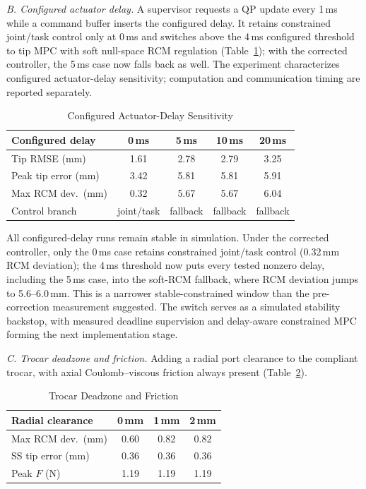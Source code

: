 \emph{B. Configured actuator delay.} A supervisor requests a QP update every 1\,ms while a command buffer inserts the configured delay. It retains constrained joint/task control only at 0\,ms and switches above the 4\,ms configured threshold to tip MPC with soft null-space RCM regulation (Table~\ref{tab:latency}); with the corrected controller, the 5\,ms case now falls back as well. The experiment characterizes configured actuator-delay sensitivity; computation and communication timing are reported separately.

\begin{table}[!t]
\caption{Configured Actuator-Delay Sensitivity}
\label{tab:latency}
\centering
\footnotesize
\setlength{\tabcolsep}{3.2pt}
\begin{tabular}{lcccc}
\toprule
Configured delay & 0\,ms & 5\,ms & 10\,ms & 20\,ms \\
\midrule
Tip RMSE (mm)   & 1.61 & 2.78 & 2.79 & 3.25 \\
Peak tip error (mm) & 3.42 & 5.81 & 5.81 & 5.91 \\
Max RCM dev.\ (mm) & 0.32 & 5.67 & 5.67 & 6.04 \\
Control branch & joint/task & fallback & fallback & fallback \\
\bottomrule
\end{tabular}
\end{table}

All configured-delay runs remain stable in simulation. Under the corrected controller, only the 0\,ms case retains constrained joint/task control (0.32\,mm RCM deviation); the 4\,ms threshold now puts every tested nonzero delay, including the 5\,ms case, into the soft-RCM fallback, where RCM deviation jumps to 5.6--6.0\,mm. This is a narrower stable-constrained window than the pre-correction measurement suggested. The switch serves as a simulated stability backstop, with measured deadline supervision and delay-aware constrained MPC forming the next implementation stage.

\emph{C. Trocar deadzone and friction.} Adding a radial port clearance to the compliant trocar, with axial Coulomb--viscous friction always present (Table~\ref{tab:deadzone}).

\begin{table}[!t]
\caption{Trocar Deadzone and Friction}
\label{tab:deadzone}
\centering
\footnotesize
\setlength{\tabcolsep}{6pt}
\begin{tabular}{lccc}
\toprule
Radial clearance & 0\,mm & 1\,mm & 2\,mm \\
\midrule
Max RCM dev.\ (mm) & 0.60 & 0.82 & 0.82 \\
SS tip error (mm) & 0.36 & 0.36 & 0.36 \\
Peak $F$ (N) & 1.19 & 1.19 & 1.19 \\
\bottomrule
\end{tabular}
\end{table}


